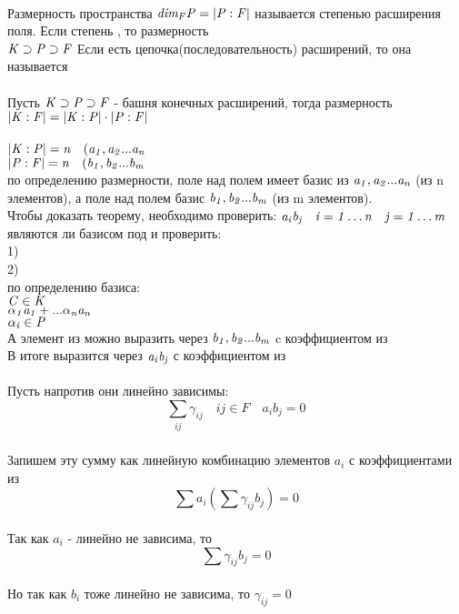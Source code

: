  \\
Размерность пространства $\mathit{dim_{F}P = |P:F|}$ называется степенью расширения поля. Если степень , то размерность  \\
$\mathit {K \supset P \supset F}$ Если есть цепочка(последовательность) расширений, то она называется  \\

 \\
Пусть $\mathit {K \supset P \supset F}$ - башня конечных расширений, тогда размерность $\mathit {|K:F|=|K:P|\cdot |P:F|}$ \\

\\
$\mathit {|K:P|=n \quad (a_{1}, a_{2}...a_{n}}$ \\
$\mathit {|P:F|=n \quad (b_{1}, b_{2}...b_{m}}$ \\
по определению размерности, поле  над полем  имеет базис из
$\mathit {a_{1}, a_{2}...a_{n}}$ (из n элементов), а поле  над полем  базис $\mathit {b_{1}, b_{2}...b_{m}}$ (из m элементов). \\
Чтобы доказать теорему, необходимо проверить: $\mathit{a_{i}b_{j} \quad i = 1 \ldots n \quad j = 1 \ldots m}$ \\
являются ли базисом  под  и проверить: \\
1)  \\
2)  \\
по определению базиса: \\
$\mathit {C \in K}$ \\
$\mathit {\alpha_{1} a_{1}+...\alpha_{n}a_{n}}$\\
$\mathit{\alpha_{i} \in P}$ \\
А элемент из  можно выразить через $\mathit {b_{1}, b_{2}...b_{m}}$ c коэффициентом из  \\
В итоге  выразится через $\mathit{a_{i}b_{j}}$ с коэффициентом из  \\

\\
Пусть напротив они линейно зависимы: \\
\[ \sum_{\substack {ij}} \gamma_{ij} \quad ij \in F \quad a_{i}b_{j} = 0\] \\
Запишем эту сумму как линейную комбинацию элементов $a_{i}$ с коэффициентами из  \\
\[ \sum a_{i} \left ( \sum \gamma_{ij} b_{j} \right) = 0 \] \\
Так как $a_{i}$ - линейно не зависима, то \\
\[\sum \gamma_{ij} b_{j} = 0\] \\
Но так как $b_{i}$ тоже линейно не зависима, то $\gamma_{ij}=0$ \\

